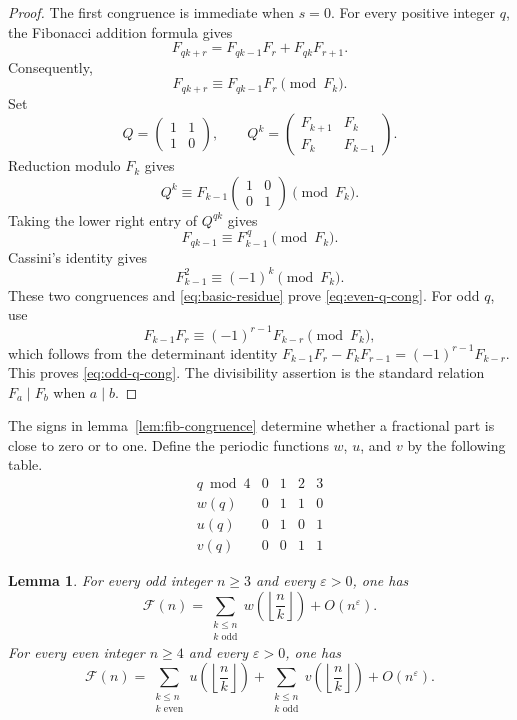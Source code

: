 \documentclass[11pt]{article}
\newtheorem{lemma}[theorem]{Lemma}
\newcommand{\FF}{\mathcal F}
\newcommand{\eps}{\varepsilon}
\begin{document}
\begin{proof}
The first congruence is immediate when $s=0$. For every positive integer
$q$, the Fibonacci addition formula gives
\[
 F_{qk+r}=F_{qk-1}F_r+F_{qk}F_{r+1}.
\]
Consequently,
\begin{equation}\label{eq:basic-residue}
 F_{qk+r}\equiv F_{qk-1}F_r\pmod {F_k}.
\end{equation}
Set
\[
 Q=\begin{pmatrix}1&1\\1&0\end{pmatrix},\qquad
 Q^k=\begin{pmatrix}F_{k+1}&F_k\\F_k&F_{k-1}\end{pmatrix}.
\]
Reduction modulo $F_k$ gives
\[
 Q^k\equiv F_{k-1}\begin{pmatrix}1&0\\0&1\end{pmatrix}\pmod{F_k}.
\]
Taking the lower right entry of $Q^{qk}$ gives
\[
 F_{qk-1}\equiv F_{k-1}^{\,q}\pmod {F_k}.
\]
Cassini's identity gives
\[
 F_{k-1}^2\equiv (-1)^k\pmod {F_k}.
\]
These two congruences and \eqref{eq:basic-residue} prove
\eqref{eq:even-q-cong}. For odd $q$, use
\[
 F_{k-1}F_r\equiv (-1)^{r-1}F_{k-r}\pmod {F_k},
\]
which follows from the determinant identity
$F_{k-1}F_r-F_kF_{r-1}=(-1)^{r-1}F_{k-r}$. This proves
\eqref{eq:odd-q-cong}. The divisibility assertion is the standard relation
$F_a\mid F_b$ when $a\mid b$.
\end{proof}

The signs in lemma~\ref{lem:fib-congruence} determine whether a fractional
part is close to zero or to one. Define the periodic functions $w$, $u$, and
$v$ by the following table.
\[
\begin{array}{c|cccc}
q\bmod4&0&1&2&3\\ \hline
w(q)&0&1&1&0\\
u(q)&0&1&0&1\\
v(q)&0&0&1&1
\end{array}
\]

\begin{lemma}\label{lem:profiles}
For every odd integer $n\geq 3$ and every $\eps>0$, one has
\begin{equation}\label{eq:odd-profile}
 \FF(n)=\sum_{\substack{k\leq n\\ k\text{ odd}}}
 w\left(\left\lfloor\frac nk\right\rfloor\right)+O(n^\eps).
\end{equation}
For every even integer $n\geq 4$ and every $\eps>0$, one has
\begin{equation}\label{eq:even-profile}
 \FF(n)=\sum_{\substack{k\leq n\\ k\text{ even}}}
 u\left(\left\lfloor\frac nk\right\rfloor\right)
 +\sum_{\substack{k\leq n\\ k\text{ odd}}}
 v\left(\left\lfloor\frac nk\right\rfloor\right)
 +O(n^\eps).
\end{equation}
\end{lemma}
\end{document}
